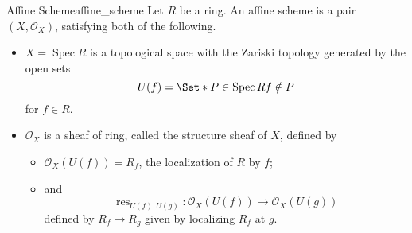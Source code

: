 \documentclass{article}
\begin{document}
\begin{definition}{Affine Scheme}{affine_scheme}
    Let $R$ be a ring.
    An affine scheme is a pair $(X,\mathcal{O}_X)$, satisfying both of the following.
    \begin{itemize}
        \item $X = \operatorname{Spec} R$ is a topological space with the Zariski topology generated by the open sets
        \[ U(f) = \Set*{P \in \operatorname{Spec} R}{f \notin P} \]
        for $f\in R$.
        \item $\mathcal{O}_X$ is a sheaf of ring, called the structure sheaf of $X$, defined by
        \begin{itemize}
            \item $\mathcal{O}_X(U(f)) = R_f$, the localization of $R$ by $f$;
            \item and
            \[ \operatorname{res}_{U(f), U(g)}: \mathcal{O}_X(U(f)) \rightarrow \mathcal{O}_X(U(g)) \]
            defined by $R_f \rightarrow R_g$ given by localizing $R_f$ at $g$.
        \end{itemize}
    \end{itemize}
\end{definition}
\end{document}
